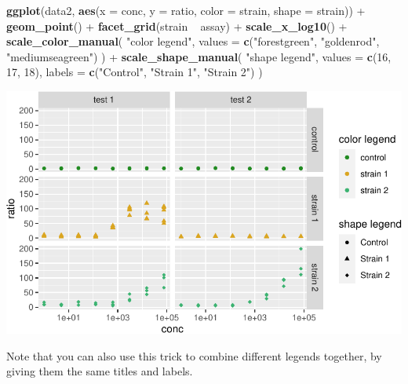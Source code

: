 \documentclass[]{book}
\newenvironment{Shaded}{}{}
\newcommand{\DataTypeTok}[1]{\textcolor[rgb]{0.56,0.13,0.00}{#1}}
\newcommand{\DecValTok}[1]{\textcolor[rgb]{0.25,0.63,0.44}{#1}}
\newcommand{\KeywordTok}[1]{\textcolor[rgb]{0.00,0.44,0.13}{\textbf{#1}}}
\newcommand{\NormalTok}[1]{#1}
\newcommand{\OperatorTok}[1]{\textcolor[rgb]{0.40,0.40,0.40}{#1}}
\newcommand{\StringTok}[1]{\textcolor[rgb]{0.25,0.44,0.63}{#1}}
\begin{document}
\begin{Shaded}
\begin{Highlighting}[]
\KeywordTok{ggplot}\NormalTok{(data2, }\KeywordTok{aes}\NormalTok{(}\DataTypeTok{x =}\NormalTok{ conc, }\DataTypeTok{y =}\NormalTok{ ratio, }\DataTypeTok{color =}\NormalTok{ strain, }\DataTypeTok{shape =}\NormalTok{ strain)) }\OperatorTok{+}
\StringTok{  }\KeywordTok{geom_point}\NormalTok{() }\OperatorTok{+}
\StringTok{  }\KeywordTok{facet_grid}\NormalTok{(strain }\OperatorTok{~}\StringTok{ }\NormalTok{assay) }\OperatorTok{+}
\StringTok{  }\KeywordTok{scale_x_log10}\NormalTok{() }\OperatorTok{+}
\StringTok{  }\KeywordTok{scale_color_manual}\NormalTok{(}
    \StringTok{"color legend"}\NormalTok{, }\DataTypeTok{values =} \KeywordTok{c}\NormalTok{(}\StringTok{"forestgreen"}\NormalTok{, }\StringTok{"goldenrod"}\NormalTok{, }\StringTok{"mediumseagreen"}\NormalTok{)}
\NormalTok{  ) }\OperatorTok{+}
\StringTok{  }\KeywordTok{scale_shape_manual}\NormalTok{(}
    \StringTok{"shape legend"}\NormalTok{, }\DataTypeTok{values =} \KeywordTok{c}\NormalTok{(}\DecValTok{16}\NormalTok{, }\DecValTok{17}\NormalTok{, }\DecValTok{18}\NormalTok{),}
    \DataTypeTok{labels =} \KeywordTok{c}\NormalTok{(}\StringTok{"Control"}\NormalTok{, }\StringTok{"Strain 1"}\NormalTok{, }\StringTok{"Strain 2"}\NormalTok{)}
\NormalTok{  )}
\end{Highlighting}
\end{Shaded}

\begin{center}\includegraphics[width=\textwidth]{TRES-Tidy-Tutorial_files/figure-latex/unnamed-chunk-149-1} \end{center}

Note that you can also use this trick to combine different legends together, by giving them the same titles and labels.
\end{document}
